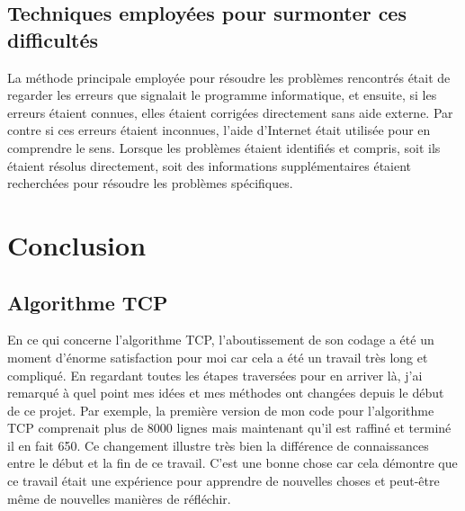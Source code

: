 \documentclass[a4paper,12pt]{report}
\begin{document}
     \subsection{Techniques employées pour surmonter ces difficultés}
     La méthode principale employée pour résoudre les problèmes rencontrés était de regarder les erreurs que signalait le programme informatique, et ensuite, si les erreurs étaient connues, elles étaient corrigées directement sans aide externe. Par contre si ces erreurs étaient inconnues, l'aide d'Internet était utilisée pour en comprendre le sens. Lorsque les problèmes étaient identifiés et compris, soit ils étaient résolus directement, soit des informations supplémentaires étaient recherchées pour résoudre les problèmes spécifiques.     
     
     \pagebreak
     
     \section{Conclusion}
     
     \subsection{Algorithme TCP}
En ce qui concerne l'algorithme TCP, l'aboutissement de son codage a été un moment d'énorme satisfaction pour moi car cela a été un travail très long et compliqué. En regardant toutes les étapes traversées pour en arriver là, j'ai remarqué à quel point mes idées et mes méthodes ont changées depuis le début de ce projet. Par exemple, la première version de mon code pour l'algorithme TCP comprenait plus de 8000 lignes mais maintenant qu'il est raffiné et terminé il en fait 650. Ce changement illustre très bien la différence de connaissances entre le début et la fin de ce travail. C'est une bonne chose car cela démontre que ce travail était une expérience pour apprendre de nouvelles choses et peut-être même de nouvelles manières de réfléchir.
     
\end{document}

